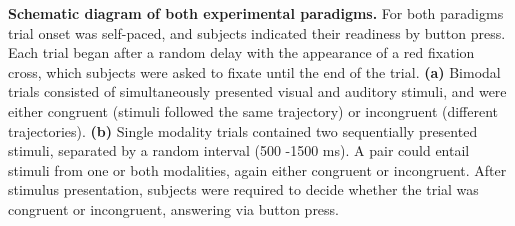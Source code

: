\textbf{Schematic diagram of both experimental paradigms.} For both paradigms trial
onset was self-paced, and subjects indicated their readiness by button
press. Each trial began after a random delay with the appearance of a red
fixation cross, which subjects were asked to fixate until the end of the
trial. \textbf{(a)} Bimodal trials consisted of simultaneously presented
visual and auditory stimuli, and were either congruent (stimuli followed
the same trajectory) or incongruent (different trajectories). \textbf{(b)}
Single modality trials contained two sequentially presented stimuli,
separated by a random interval (500 -1500 ms). A pair could entail stimuli
from one or both modalities, again either congruent or incongruent. After
stimulus presentation, subjects were required to decide whether the trial
was congruent or incongruent, answering via button press.
